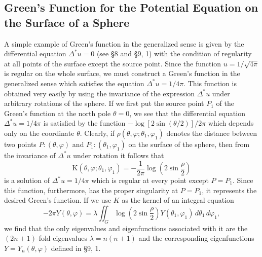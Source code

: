 \subsection{Green's Function for the Potential Equation on the Surface of a Sphere}
A simple example of Green's function in the generalized sense is given by the differential equation $\Delta^*u=0$ (see \S8 and \S9, 1) with the condition of regularity at all points of the surface except the source point. Since the function $u=1/\sqrt{4\pi}$ is regular on the whole surface, we must construct a Green's function in the generalized sense which satisfies the equation $\Delta^*u=1/4\pi$. This function is obtained very easily by using the invariance of the expression $\Delta^*u$ under arbitrary rotations of the sphere. If we first put the source point $P_1$ of the Green's function at the north pole $\theta=0$, we see that the differential equation $\Delta^*u=1/4\pi$ is satisfied by the function $-\log[2\sin(\theta/2)]/2\pi$ which depends only on the coordinate $\theta$. Clearly, if $\rho(\theta,\varphi;\theta_1,\varphi_1)$ denotes the distance between two points $P:(\theta,\varphi)$ and $P_1:(\theta_1,\varphi_1)$ on the surface of the sphere, then from the invariance of $\Delta^*u$ under rotation it follows that
\[
\mathrm K(\theta,\varphi;\theta_1,\varphi_1)=-\frac1{2\pi}\log\left(2\sin\frac\rho2\right)
\]
is a solution of $\Delta^*u=1/4\pi$ which is regular at every point except $P=P_1$. Since this function, furthermore, has the proper singularity at $P=P_1$, it represents the desired Green's function. If we use $K$ as the kernel of an integral equation
\[
-2\pi Y(\theta,\varphi)=\lambda\iint_G\log\left(2\sin\frac\rho2\right)Y(\theta_1,\varphi_1)\,d\theta_1\,d\varphi_1,
\]
we find that the only eigenvalues and eigenfunctions associated with it are the $(2n+1)$-fold eigenvalues $\lambda=n(n+1)$ and the corresponding eigenfunctions $Y=Y_n(\theta,\varphi)$ defined in \S9, 1.

